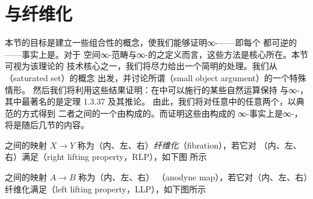 \section{\trAnodyneMap{}与纤维化}
\label{sec:anodyne-maps-and-fibrations}

本节的目标是建立一些组合性的概念，使我们能够证明∞-\trGroupoid{}——即每个%
\trMorphism{}都可逆的\trInfinityCategories{}——事实上是\trKanComplex{}。对于%
空间∞-范畴与∞-\trCategories{}的\trInfinityCategory{}之定义而言，这些方法是核心所在。本节可视为该理论的
技术核心之一，我们将尽力给出一个简明的处理。我们从\trSaturatedSet{}（saturated set）的概念
出发，并讨论所谓\trQuillen{}\trSmallObjectArgument{}（small object argument）的一个特殊情形。
然后我们将利用这些结果证明：在\trSimplicialSets{}中可以施行的某些自然运算保持%
\trInfinityCategories{}与∞-\trGroupoid{}，其中最著名的是定理 1.3.37 及其推论。
由此，我们将对任意\trInfinityCategory{}中的任意两个\trObject{}，以典范的方式得到
二者之间的一个由\trMorphism{}构成的\trInfinityCategory{}。而证明这些由\trMorphism{}构成的%
∞-\trCategories{}事实上是∞-\trGroupoid{}，将是随后几节的内容。

\begin{definition}\label{def:fibration}
\trSimplicialSet{}之间的映射 $X \to Y$ 称为（内、左、右）\emph{纤维化}（fibration），若它对%
（内、左、右）\trHornInclusion{}满足\trRightLiftingProperty{}（right lifting property，RLP），如下图
所示
\begin{center}
\end{center}
\end{definition}

\begin{definition}\label{def:anodyne-map}
\trSimplicialSet{}之间的映射 $A \to B$ 称为（内、左、右）\emph{\trAnodyneMap{}}%
（anodyne map），若它对（内、左、右）纤维化满足\trLeftLiftingProperty{}（left lifting
property，LLP），如下图所示
\begin{center}
\end{center}
\end{definition}

